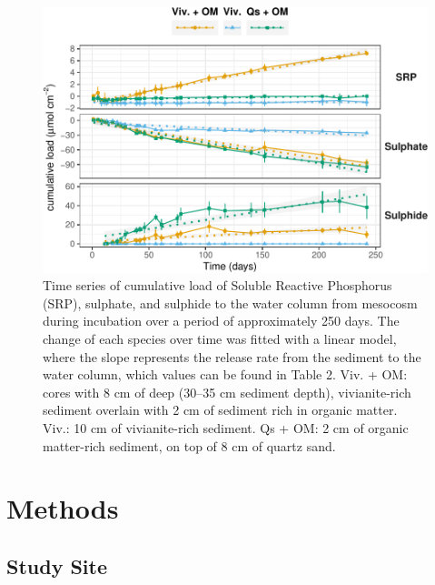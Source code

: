 \documentclass[12pt,twoside]{book}
\begin{document}
\begin{figure}
\centering
\includegraphics{my-thesis_files/figure-latex/IncubationTimeseries-1.pdf}
\caption{\label{fig:IncubationTimeseries}Time series of cumulative load of Soluble Reactive Phosphorus (SRP), sulphate, and sulphide to the water column from mesocosm during incubation over a period of approximately 250 days. The change of each species over time was fitted with a linear model, where the slope represents the release rate from the sediment to the water column, which values can be found in Table 2. Viv. + OM: cores with 8 cm of deep (30--35 cm sediment depth), vivianite-rich sediment overlain with 2 cm of sediment rich in organic matter. Viv.: 10 cm of vivianite-rich sediment. Qs + OM: 2 cm of organic matter-rich sediment, on top of 8 cm of quartz sand.}
\end{figure}

\section{Methods}\label{methods}

\subsection{Study Site}\label{study-site}
\end{document}
